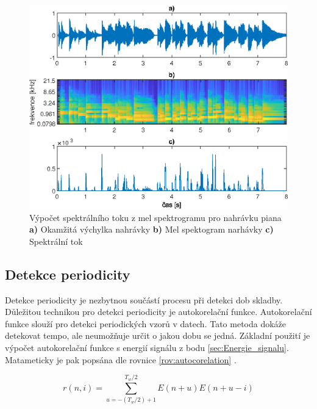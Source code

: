   \begin{figure}[H]
    \centering
    \includegraphics[width = 0.8\linewidth]{obrazky/Mel_spektralni_tok.eps}
    \caption{Výpočet spektrálního toku z mel spektrogramu pro nahrávku piana \textbf{a)} Okamžitá výchylka nahrávky \textbf{b)} Mel spektogram narhávky \textbf{c)} Spektrální tok}
    \label{fig:Mel_spectralni_tok}
  \end{figure}


  \subsection{Detekce periodicity}
    Detekce periodicity je nezbytnou součástí procesu při detekci dob skladby.
    Důležitou technikou pro detekci periodicity je autokorelační funkce.
    Autokorelační funkce slouží pro detekci periodických vzorů v datech.
    Tato metoda dokáže detekovat tempo, ale neumožňuje určit o jakou dobu se jedná.
    Základní použití je výpočet autokorelační funkce s energií signálu z bodu \ref{sec:Energie_signalu}. Matameticky je pak popsána dle rovnice \ref{rov:autocorelation} \cite{Signal_processing_methods_for_music_transcription}.

    \begin{equation}
      r(n,i) = \sum_{u = -(T_w / 2) + 1}^{T_w / 2} E(n+u)E(n+u-i)
      \label{rov:autocorelation}
    \end{equation}

